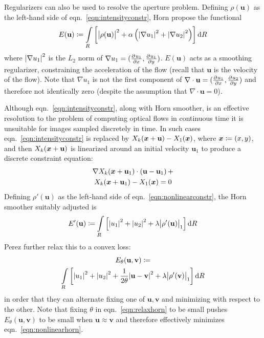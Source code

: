 Regularizers can also be used to resolve the aperture problem.
%
Defining \(\rho(\mathbf{u})\) as the left-hand side of eqn.~\eqref{eqn:intensityconstr}, Horn \etal \cite{horn1993determining} propose the functional
\begin{equation}
	E(\mathbf{u}) \coloneqq \int\limits_R \left[ \abs{\rho(\mathbf{u})}^2 + \alpha \left( \abs{ \nabla u_1 }^2 + \abs{ \nabla u_2 }^2\right) \right] \dif R
	\label{eqn:linearhorn}
\end{equation}
where \(\abs{ \nabla u_1 }^2\) is the \(L_2\) norm of \(\nabla u_1 = (\pd{u_1}{x}, \pd{u_1}{y})\).
%
\(E(\mathbf{u})\) acts as a smoothing regularizer, constraining the acceleration of the flow (recall that \(\mathbf{u}\) is the velocity of the flow).
%
Note that \(\nabla u_1\) is not the first component of \(\nabla \cdot \mathbf{u} = (\pd{u_1}{x}, \pd{u_2}{y})\) and therefore not identically zero (despite the assumption that  \(\nabla \cdot \mathbf{u} = 0\)).

Although eqn.~\eqref{eqn:intensityconstr}, along with Horn smoother, is an effective resolution to the problem of computing optical flows in continuous time it is unsuitable for images sampled discretely in time.
%
In such cases eqn.~\eqref{eqn:intensityconstr} is replaced by \( X_k(\bm{x} + \mathbf{u}) - X_1(\bm{x})\), where \(\bm{x} \coloneqq (x,y)\), and then \( X_k(\bm{x} + \mathbf{u})\) is  linearized around an initial velocity \(\mathbf{u}_1\) to produce a discrete constraint equation:
\begin{multline}
	\nabla X_k (\bm{x} + \mathbf{u}_1)\cdot (\mathbf{u} - \mathbf{u}_1)\, + \\ X_k(\bm{x} + \mathbf{u}_1)  -  X_1(\bm{x}) = 0
	\label{eqn:nonlinearconstr}
\end{multline}
Defining \(\rho'(\mathbf{u})\) as the left-hand side of eqn.~\eqref{eqn:nonlinearconstr}, the Horn smoother suitably adjusted is
\begin{equation}
	E'(\mathbf{u}) \coloneqq \int\limits_R \left[ \abs{ u_1 }^2 + \abs{ u_2 }^2 + \lambda \abs{ \rho'(\mathbf{u}) }_1 \right] \dif R
	\label{eqn:nonlinearhorn}
\end{equation}
%
Perez \etal \cite{perez2013tv} further relax this to a convex loss:
\begin{multline}
	E_{\theta}(\mathbf{u}, \mathbf{v}) \coloneqq \\
	\int\limits_R \left[ \abs{ u_1 }^2 + \abs{ u_2 }^2 + \frac{1}{2\theta}\abs{ \mathbf{u} - \mathbf{v} }^2 + \lambda \abs{ \rho'(\mathbf{v}) }_1 \right] \dif R
	\label{eqn:relaxhorn}
\end{multline}
in order that they can alternate fixing one of \(\mathbf{u}, \mathbf{v}\) and minimizing with respect to the other.
%
Note that fixing \(\theta\) in eqn.~\eqref{eqn:relaxhorn} to be small pushes \(E_{\theta}(\mathbf{u}, \mathbf{v})\) to be small when \(\mathbf{u}\approx \mathbf{v}\) and therefore effectively minimizes eqn.~\eqref{eqn:nonlinearhorn}.

